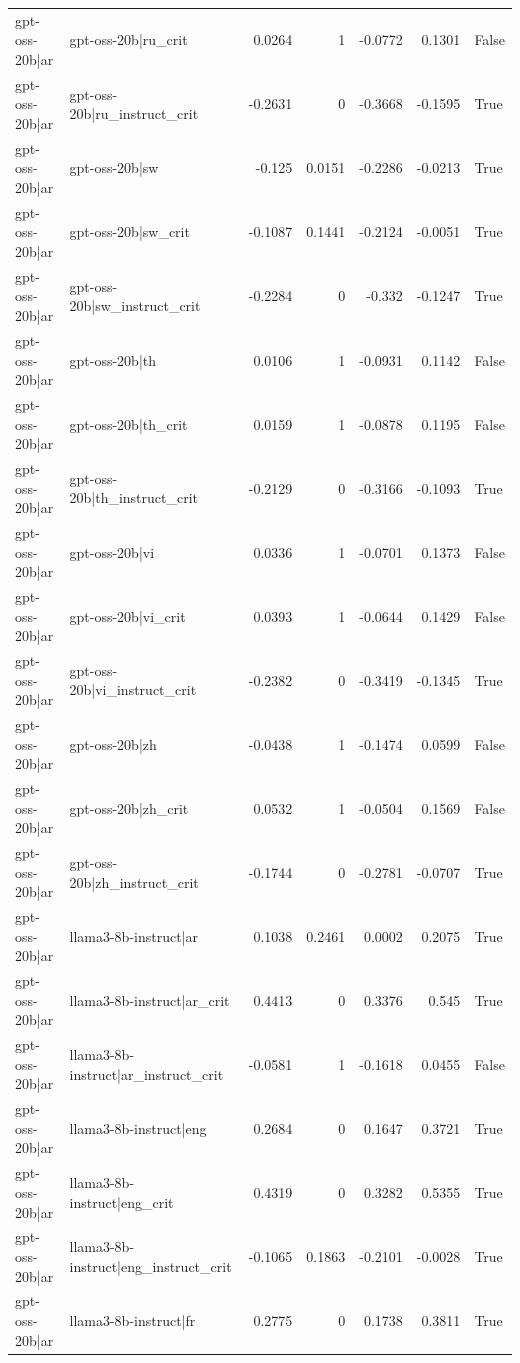 \begin{table}
\begin{tabular}{l l r r r r l}
gpt-oss-20b|ar & gpt-oss-20b|ru_crit & 0.0264 & 1 & -0.0772 & 0.1301 & False \\
gpt-oss-20b|ar & gpt-oss-20b|ru_instruct_crit & -0.2631 & 0 & -0.3668 & -0.1595 & True \\
gpt-oss-20b|ar & gpt-oss-20b|sw & -0.125 & 0.0151 & -0.2286 & -0.0213 & True \\
gpt-oss-20b|ar & gpt-oss-20b|sw_crit & -0.1087 & 0.1441 & -0.2124 & -0.0051 & True \\
gpt-oss-20b|ar & gpt-oss-20b|sw_instruct_crit & -0.2284 & 0 & -0.332 & -0.1247 & True \\
gpt-oss-20b|ar & gpt-oss-20b|th & 0.0106 & 1 & -0.0931 & 0.1142 & False \\
gpt-oss-20b|ar & gpt-oss-20b|th_crit & 0.0159 & 1 & -0.0878 & 0.1195 & False \\
gpt-oss-20b|ar & gpt-oss-20b|th_instruct_crit & -0.2129 & 0 & -0.3166 & -0.1093 & True \\
gpt-oss-20b|ar & gpt-oss-20b|vi & 0.0336 & 1 & -0.0701 & 0.1373 & False \\
gpt-oss-20b|ar & gpt-oss-20b|vi_crit & 0.0393 & 1 & -0.0644 & 0.1429 & False \\
gpt-oss-20b|ar & gpt-oss-20b|vi_instruct_crit & -0.2382 & 0 & -0.3419 & -0.1345 & True \\
gpt-oss-20b|ar & gpt-oss-20b|zh & -0.0438 & 1 & -0.1474 & 0.0599 & False \\
gpt-oss-20b|ar & gpt-oss-20b|zh_crit & 0.0532 & 1 & -0.0504 & 0.1569 & False \\
gpt-oss-20b|ar & gpt-oss-20b|zh_instruct_crit & -0.1744 & 0 & -0.2781 & -0.0707 & True \\
gpt-oss-20b|ar & llama3-8b-instruct|ar & 0.1038 & 0.2461 & 0.0002 & 0.2075 & True \\
gpt-oss-20b|ar & llama3-8b-instruct|ar_crit & 0.4413 & 0 & 0.3376 & 0.545 & True \\
gpt-oss-20b|ar & llama3-8b-instruct|ar_instruct_crit & -0.0581 & 1 & -0.1618 & 0.0455 & False \\
gpt-oss-20b|ar & llama3-8b-instruct|eng & 0.2684 & 0 & 0.1647 & 0.3721 & True \\
gpt-oss-20b|ar & llama3-8b-instruct|eng_crit & 0.4319 & 0 & 0.3282 & 0.5355 & True \\
gpt-oss-20b|ar & llama3-8b-instruct|eng_instruct_crit & -0.1065 & 0.1863 & -0.2101 & -0.0028 & True \\
gpt-oss-20b|ar & llama3-8b-instruct|fr & 0.2775 & 0 & 0.1738 & 0.3811 & True \\

\end{tabular}
\end{table}
